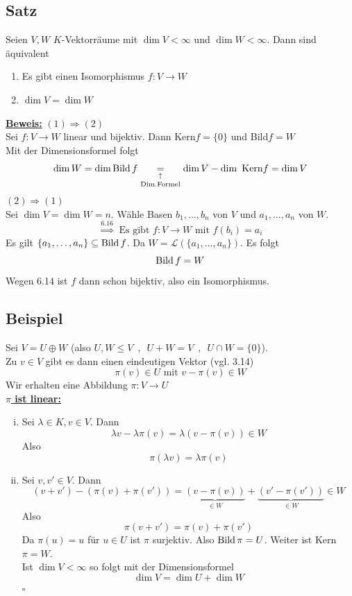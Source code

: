 \subsection{Satz} %
\label{sub:satz}
Seien $V,W$ \(K\)-Vektorräume mit $\dim V < \infty$ und $\dim W < \infty$. Dann sind äquivalent
\begin{enumerate}[(1)]
	\item Es gibt einen Isomorphismus $f: V \to W$
	\item $\dim V = \dim W$
\end{enumerate}
\underline{\textbf{Beweis:}} $(1) \Rightarrow (2)$ \\
Sei $f: V \to W$ linear und bijektiv. Dann Kern$f = \{0\}$ und Bild$f = W$ \\
Mit der Dimensionsformel folgt
\[
	\dim W = \dim \operatorname{Bild} f \underset{\text{Dim.Formel}}{\underset{\uparrow}{=}} \dim V - \dim \text{ Kern} f = \dim V
\]
$(2) \Rightarrow (1)$ \\
Sei $\dim V = \dim W = n$. Wähle Basen $b_1, \ldots , b_n$ von $V$ und $a_1 , \ldots , a_n$ von $W$. \\
\[
	\overset{6.16}{\Rightarrow} \text{ Es gibt } f: V \to W \text{ mit }  f(b_i) = a_i
\]
Es gilt $\{ a_1, \ldots , a_n\} \subseteq \operatorname{Bild} f$. Da $W = \mathcal{L} \left(\{a_1 , \ldots , a_n \}\right)$. Es folgt
\[
	\operatorname{Bild} f = W
\]
Wegen 6.14 ist $f$ dann schon bijektiv, also ein Isomorphismus.

\subsection{Beispiel} %
\label{sub:beispiel}
Sei $V= U \oplus W$ (also $U,W \leq V \enspace , \enspace U + W = V \enspace , \enspace U \cap W =  \{0\}$). \\
Zu $v \in V$ gibt es dann einen eindeutigen Vektor (vgl. 3.14)
\[
	\pi (v) \in U \text{ mit } v- \pi (v) \in W 
\]
Wir erhalten eine Abbildung $\pi : V \to U$
\vspace{\baselineskip} \\
\underline{\textbf{$\pi$ ist linear:}}
\begin{enumerate}[(i)]
	\item Sei $\lambda \in K , v \in V$. Dann
	\[
		\lambda v - \lambda \pi (v) = \lambda \left(v- \pi (v)\right) \in W
	\]
	Also
	\[
		\pi (\lambda v) = \lambda \pi (v)
	\]
	\item Sei $v, v' \in V$. Dann
	\[
		(v+v')- \left( \pi (v)+ \pi(v') \right) = \underbrace{\left( v- \pi(v) \right)}_{\in W} + \underbrace{\left( v' - \pi(v') \right)}_{\in W} \in W
	\]
	Also
	\[
		\pi (v+v') = \pi(v) + \pi(v')
	\]
	Da $\pi(u)=u$ für $u \in U$ ist $\pi$ surjektiv. Also $\operatorname{Bild} \pi = U$. Weiter ist Kern $\pi = W$. \\
	Ist $\dim V < \infty$ so folgt mit der Dimensionsformel
	\[
		\dim V = \dim U + \dim W
	\]
	\hfill $\square$
\end{enumerate}

